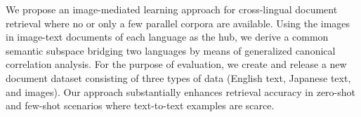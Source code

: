 We propose an image-mediated learning approach for cross-lingual document retrieval where no or only a few parallel corpora are available. Using the images in image-text documents of each language as the hub, we derive a common semantic subspace bridging two languages by means of generalized canonical correlation analysis. For the purpose of evaluation, we create and release a new document dataset consisting of three types of data (English text, Japanese text, and images). Our approach substantially enhances retrieval accuracy in zero-shot and few-shot scenarios where text-to-text examples are scarce.

